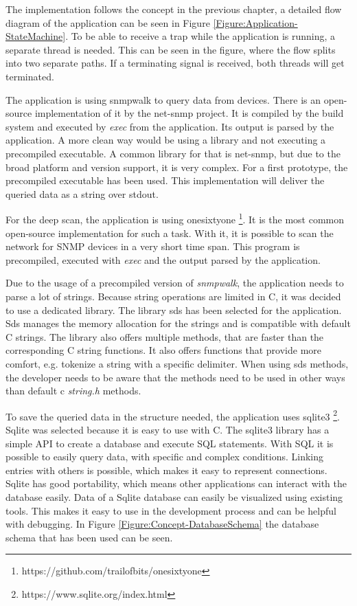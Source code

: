 \label{Section:Implementation}

The implementation follows the concept in the previous chapter, a detailed flow diagram of the application can be seen in Figure \ref{Figure:Application-StateMachine}. To be able to receive a trap while the application is running, a separate thread is needed. This can be seen in the figure, where the flow splits into two separate paths. If a terminating signal is received, both threads will get terminated.

The application is using snmpwalk to query data from devices. There is an open-source implementation of it by the net-snmp project. It is compiled by the build system and executed by \textit{exec} from the application. Its output is parsed by the application. A more clean way would be using a library and not executing a precompiled executable. A common library for that is net-snmp, but due to the broad platform and version support, it is very complex. For a first prototype, the precompiled executable has been used. This implementation will deliver the queried data as a string over stdout.

For the deep scan, the application is using onesixtyone \footnote{https://github.com/trailofbits/onesixtyone}. It is the most common open-source implementation for such a task. With it, it is possible to scan the network for SNMP devices in a very short time span. This program is precompiled, executed with \textit{exec} and the output parsed by the application.

Due to the usage of a precompiled version of \textit{snmpwalk}, the application needs to parse a lot of strings. Because string operations are limited in C, it was decided to use a dedicated library. The library sds has been selected for the application. Sds manages the memory allocation for the strings and is compatible with default C strings. The library also offers multiple methods, that are faster than the corresponding C string functions. It also offers functions that provide more comfort, e.g. tokenize a string with a specific delimiter. When using sds methods, the developer needs to be aware that the methods need to be used in other ways than default c \textit{string.h} methods.

To save the queried data in the structure needed, the application uses sqlite3 \footnote{https://www.sqlite.org/index.html}. Sqlite was selected because it is easy to use with C. The sqlite3 library has a simple API to create a database and execute SQL statements. With SQL it is possible to easily query data, with specific and complex conditions. Linking entries with others is possible, which makes it easy to represent connections. Sqlite has good portability, which means other applications can interact with the database easily. Data of a Sqlite database can easily be visualized using existing tools. This makes it easy to use in the development process and can be helpful with debugging. In Figure \ref{Figure:Concept-DatabaseSchema} the database schema that has been used can be seen.

